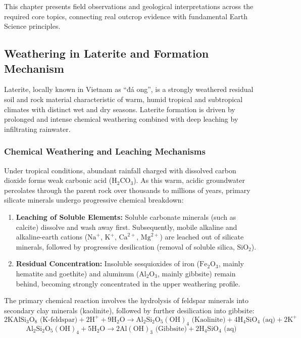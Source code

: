 \documentclass[11pt, a4paper]{article}
\begin{document}
This chapter presents field observations and geological interpretations across the required core topics, connecting real outcrop evidence with fundamental Earth Science principles.

\subsection{Weathering in Laterite and Formation Mechanism}
\label{subsec:laterite}

Laterite, locally known in Vietnam as ``đá ong'', is a strongly weathered residual soil and rock material characteristic of warm, humid tropical and subtropical climates with distinct wet and dry seasons. Laterite formation is driven by prolonged and intense chemical weathering combined with deep leaching by infiltrating rainwater.

\subsubsection{Chemical Weathering and Leaching Mechanisms}

Under tropical conditions, abundant rainfall charged with dissolved carbon dioxide forms weak carbonic acid ($\text{H}_2\text{CO}_3$). As this warm, acidic groundwater percolates through the parent rock over thousands to millions of years, primary silicate minerals undergo progressive chemical breakdown:
\begin{enumerate}
    \item \textbf{Leaching of Soluble Elements:} Soluble carbonate minerals (such as calcite) dissolve and wash away first. Subsequently, mobile alkaline and alkaline-earth cations ($\text{Na}^+$, $\text{K}^+$, $\text{Ca}^{2+}$, $\text{Mg}^{2+}$) are leached out of silicate minerals, followed by progressive desilication (removal of soluble silica, $\text{SiO}_2$).
    \item \textbf{Residual Concentration:} Insoluble sesquioxides of iron ($\text{Fe}_2\text{O}_3$, mainly hematite and goethite) and aluminum ($\text{Al}_2\text{O}_3$, mainly gibbsite) remain behind, becoming strongly concentrated in the upper weathering profile.
\end{enumerate}

The primary chemical reaction involves the hydrolysis of feldspar minerals into secondary clay minerals (kaolinite), followed by further desilication into gibbsite:
\begin{equation}
    2\text{KAlSi}_3\text{O}_8\text{ (K-feldspar)} + 2\text{H}^+ + 9\text{H}_2\text{O} \longrightarrow \text{Al}_2\text{Si}_2\text{O}_5(\text{OH})_4\text{ (Kaolinite)} + 4\text{H}_4\text{SiO}_4\text{ (aq)} + 2\text{K}^+
\end{equation}
\begin{equation}
    \text{Al}_2\text{Si}_2\text{O}_5(\text{OH})_4 + 5\text{H}_2\text{O} \longrightarrow 2\text{Al}(\text{OH})_3\text{ (Gibbsite)} + 2\text{H}_4\text{SiO}_4\text{ (aq)}
\end{equation}
\end{document}
